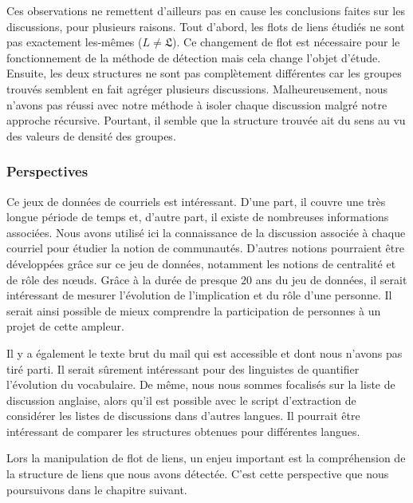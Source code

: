 Ces observations ne remettent d'ailleurs pas en cause les conclusions faites sur les discussions, pour plusieurs raisons.
Tout d'abord, les flots de liens étudiés ne sont pas exactement les-mêmes ($L\neq \mathfrak{L}$).
Ce changement de flot est nécessaire pour le fonctionnement de la méthode de détection mais cela change l'objet d'étude.
Ensuite, les deux structures ne sont pas complètement différentes car les groupes trouvés semblent en fait agréger plusieurs discussions.
Malheureusement, nous n'avons pas réussi avec notre méthode à isoler chaque discussion malgré notre approche récursive.
Pourtant, il semble que la structure trouvée ait du sens au vu des valeurs de densité des groupes.

\subsubsection{Perspectives}

Ce jeux de données de courriels est intéressant.
D'une part, il couvre une très longue période de temps et, d'autre part, il existe de nombreuses informations associées.
Nous avons utilisé ici la connaissance de la discussion associée à chaque courriel pour étudier la notion de communautés.
D'autres notions pourraient être développées grâce sur ce jeu de données, notamment les notions de centralité et de rôle des n\oe{}uds.
Grâce à la durée de presque $20$ ans du jeu de données, il serait intéressant de mesurer l'évolution de l'implication et du rôle d'une personne.
Il serait ainsi possible de mieux comprendre la participation de personnes à un projet de cette ampleur.

Il y a également le texte brut du mail qui est accessible et dont nous n'avons pas tiré parti.
Il serait sûrement intéressant pour des linguistes de quantifier l'évolution du vocabulaire.
De même, nous nous sommes focalisés sur la liste de discussion anglaise, alors qu'il est possible avec le script d'extraction de considérer les listes de discussions dans d'autres langues.
Il pourrait être intéressant de comparer les structures obtenues pour différentes langues.

\bigskip



Lors la manipulation de flot de liens, un enjeu important est la compréhension de la structure de liens que nous avons détectée.
C'est cette perspective que nous poursuivons dans le chapitre suivant.

